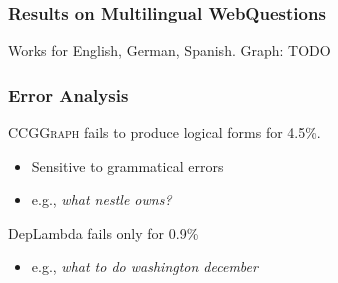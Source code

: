 \documentclass[mathserif,12pt]{beamer}
\newcommand \ccggraph{\textsc{CCGGraph}\xspace}
\begin{document}
\begin{frame}
\end{frame}

\begin{frame}
\frametitle{Results on Multilingual WebQuestions}
\huge Works for English, German, Spanish. Graph: TODO
\end{frame}

\begin{frame}
\frametitle{Error Analysis}
 \ccggraph fails to produce logical forms for 4.5\%.
 \begin{itemize}
  \item Sensitive to grammatical errors
  \item e.g., \textsl{what nestle owns?}
 \end{itemize}  
 
 \vspace{2em}
 DepLambda fails only for 0.9\%
 \begin{itemize}
   \item e.g., \textsl{what to do washington december}
 \end{itemize}  
\end{frame}
\end{document}
